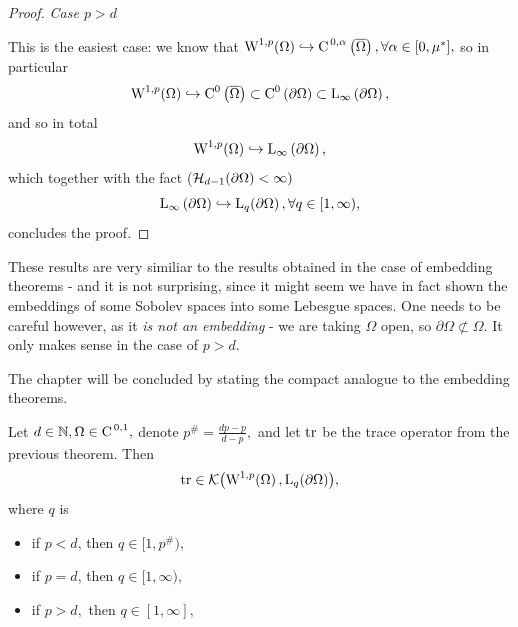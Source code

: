 \documentclass{article}
\begin{document}
\begin{proof}
	\textit{Case $p>d$}

	This is the easiest case: we know that $\WkpSet[1][p]{\Omega} \hookrightarrow \CklSet{0}{\alpha}{\overline{\Omega}}, \forall \alpha \in [0,\mu^{*}],$ so in particular
	\[
		\WkpSet[1][p]{\Omega} \hookrightarrow \CkSet{0}{\overline{\Omega}} \subset \CkSet{0}{\partial \Omega} \subset \LinfSet{\partial \Omega},
	\]
	and so in total
	\[
		\WkpSet[1][p]{\Omega} \hookrightarrow \LinfSet{\partial \Omega},
	\]
	which together with the fact ($\mathcal{H}_{d-1}\qty(\partial \Omega) < \infty)$
	\[
		\LinfSet{\partial \Omega} \hookrightarrow \LpSet[q]{\partial \Omega}, \forall q \in [1, \infty),
	\]
	concludes the proof.
\end{proof}

\begin{remark}
	These results are very similiar to the results obtained in the case of embedding theorems - and it is not surprising, since it might seem we have in fact shown the embeddings of some Sobolev spaces into some Lebesgue spaces. One needs to be careful however, as it \textit{is not an embedding} - we are taking $\Omega$ open, so $\partial \Omega \not \subset \Omega.$ It only makes sense in the case of $p > d.$
\end{remark}
The chapter will be concluded by stating the compact analogue to the embedding theorems.


\begin{theorem}
    Let $d \in {\mathbb N}, \Omega \in \text{C}^{\!\,\, 0,1},$ denote $p^{\#} = \frac{dp-p}{d-p},$ and let $\trace$ be the trace operator from the previous theorem. Then
    \[
	    \trace \in \mathcal{K}\qty(\WkpSet[1][p]{\Omega}, \LpSet[q]{\partial \Omega}),
    \]
    where $q$ is
\begin{itemize}
	\item if $p < d$, then $q \in [1, p^{\#}),$
	\item if $p = d$, then $q \in [1, \infty),$
	\item if $p > d,$ then $q \in [1, \infty],$
\end{itemize}
\end{theorem}
\end{document}
